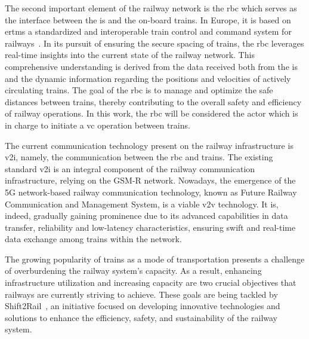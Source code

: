 The second important element of the railway network is the \gls{rbc} which serves as the interface between the \gls{is} and the on-board trains. In Europe, it is based on \gls{ertms} a standardized and interoperable train control and command system for railways~\cite{ertms}. In its pursuit of ensuring the secure spacing of trains, the \gls{rbc} leverages real-time insights into the current state of the railway network. This comprehensive understanding is derived from the data received both from the \gls{is} and the dynamic information regarding the positions and velocities of actively circulating trains. The goal of the \gls{rbc} is to manage and optimize the safe distances between trains, thereby contributing to the overall safety and efficiency of railway operations. In this work, the \gls{rbc} will be considered the actor which is in charge to initiate a \gls{vc} operation between trains.
%

\begin{comment}
	To better understand the structure and complexity of the railway network, Figure \ref{fig:railwayNetwork} illustrates the various components and their interconnections. As the latter demonstrates, the \gls{is} is the core of the entire system, with all the railway elements and the \gls{rbc} connected to it. This allows for centralized control and real-time monitoring of the entire network, ensuring the safe and efficient operation of the railway system.
\end{comment}


The current communication technology present on the railway infrastructure is \gls{v2i}, namely, the communication between the \gls{rbc} and trains. The existing standard \gls{v2i} is an integral component of the railway communication infrastructure, relying on the GSM-R network. Nowadays, the emergence of the 5G network-based railway communication technology, known as Future Railway Communication and Management System\cite{frmcs}, is a viable \gls{v2v} technology. It is, indeed,  gradually gaining prominence due to its advanced capabilities in data transfer, reliability and  low-latency characteristics, ensuring swift and real-time data exchange among trains within the network.


The growing popularity of trains as a mode of transportation presents a challenge of overburdening the railway system's capacity. As a result, enhancing infrastructure utilization and increasing capacity are two crucial objectives that railways are currently striving to achieve. These goals are being tackled by Shift2Rail~\cite{shift2rail}, an initiative focused on developing innovative technologies and solutions to enhance the efficiency, safety, and sustainability of the railway system.



